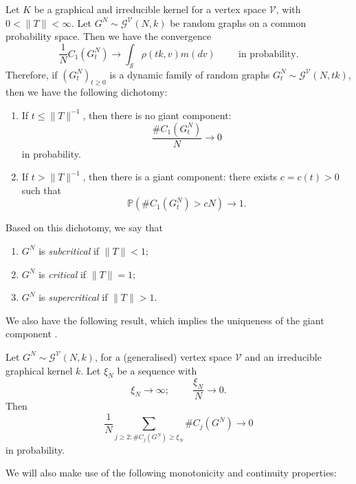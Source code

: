    \begin{theorem}\label{thrm: RG1} Let $K$ be a graphical and irreducible kernel for a vertex space $\mathcal{V}$, with $0<\|T\|< \infty.$ Let $G^N\sim \mathcal{G}^\mathcal{V}(N, k)$ be random graphs on a common probability space. Then we have the convergence \begin{equation}
       \frac{1}{N}C_1(G^N_t)\rightarrow \int_{\mathcal{S}} \rho(tk, v) m(dv) \hspace{1cm} \text{in probability.}
   \end{equation}
   Therefore, if $(G^N_t)_{t\geq 0}$ is a dynamic family of random graphs $
       G^N_t \sim \mathcal{G}^\mathcal{V}(N, tk)$, then we have the following dichotomy:  \begin{enumerate}[label=\roman{*}).]
       \item If $t\leq \|T\|^{-1}$, then there is no giant component: \begin{equation}
           \frac{\#C_1(G^N_t)}{N} \rightarrow 0
       \end{equation} in probability.
       \item If $t>\|T\|^{-1}$, then there is a giant component: there exists $c=c(t)>0$ such that
       \begin{equation}
           \mathbb{P}(\#C_1(G^N_t)>cN)\rightarrow 1.
       \end{equation}
   \end{enumerate}\end{theorem}
   \begin{remark} Based on this dichotomy, we say that \begin{enumerate}[label=\roman{*}).]
       \item $G^N$ is \emph{subcritical} if $\|T\|<1;$
       \item $G^N$ is \emph{critical} if $\|T\|=1;$
       \item $G^N$ is \emph{supercritical} if $\|T\|>1.$
   \end{enumerate} \end{remark} We also have the following result, which implies the uniqueness of the giant component \cite[Theorem 3.6]{BJR07}.
   \begin{theorem}\label{thrm: RG2} Let $G^N\sim \mathcal{G}^\mathcal{V}(N, k)$, for a (generalised) vertex space $\mathcal{V}$ and an irreducible graphical kernel $k$. Let $\xi_N$ be a sequence with  \begin{equation}
       \xi_N\rightarrow \infty; \hspace{1cm} \frac{\xi_N}{N}\rightarrow 0.
   \end{equation} Then \begin{equation}
       \frac{1}{N}\sum_{j\geq 2: \#C_j(G^N)\geq \xi_N}\#C_j(G^N) \rightarrow 0
   \end{equation} in probability. \end{theorem}   We will also make use of the following monotonicity and continuity properties: \cite[Theorem 6.4]{BJR07}
